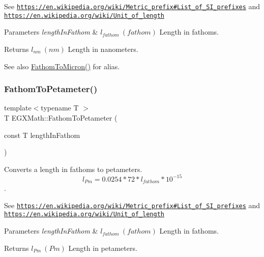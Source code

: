 See \href{https://en.wikipedia.org/wiki/Metric_prefix#List_of_SI_prefixes}{\tt https\+://en.\+wikipedia.\+org/wiki/\+Metric\+\_\+prefix\#\+List\+\_\+of\+\_\+\+S\+I\+\_\+prefixes} and \href{https://en.wikipedia.org/wiki/Unit_of_length}{\tt https\+://en.\+wikipedia.\+org/wiki/\+Unit\+\_\+of\+\_\+length} 
\begin{DoxyParams}{Parameters}
{\em length\+In\+Fathom} & $ l_{fathom}\ (fathom)$ Length in fathoms. \\
\hline
\end{DoxyParams}
\begin{DoxyReturn}{Returns}
$ l_{nm}\ (nm)$ Length in nanometers. 
\end{DoxyReturn}
\begin{DoxySeeAlso}{See also}
\mbox{\hyperlink{group___e_g_x_math-_conversions-_length_conversions-_nautical-_fathom-_non-_s_i_ga491b6bb1b4db49ba22471e9ca9855198}{Fathom\+To\+Micron()}} for alias. 
\end{DoxySeeAlso}
\mbox{\label{group___e_g_x_math-_conversions-_length_conversions-_nautical-_fathom-_s_i_ga1b39213b85524f677fed7b3d5a7052ce}} 
\subsubsection{\texorpdfstring{Fathom\+To\+Petameter()}{FathomToPetameter()}}
{\footnotesize\ttfamily template$<$typename T $>$ \\
T E\+G\+X\+Math\+::\+Fathom\+To\+Petameter (\begin{DoxyParamCaption}\item[{const T}]{length\+In\+Fathom }\end{DoxyParamCaption})}



Converts a length in fathoms to petameters. \[ l_{Pm}=0.0254 * 72 * l_{fathom} * 10^{-15} \]. 

See \href{https://en.wikipedia.org/wiki/Metric_prefix#List_of_SI_prefixes}{\tt https\+://en.\+wikipedia.\+org/wiki/\+Metric\+\_\+prefix\#\+List\+\_\+of\+\_\+\+S\+I\+\_\+prefixes} and \href{https://en.wikipedia.org/wiki/Unit_of_length}{\tt https\+://en.\+wikipedia.\+org/wiki/\+Unit\+\_\+of\+\_\+length} 
\begin{DoxyParams}{Parameters}
{\em length\+In\+Fathom} & $ l_{fathom}\ (fathom)$ Length in fathoms. \\
\hline
\end{DoxyParams}
\begin{DoxyReturn}{Returns}
$ l_{Pm}\ (Pm)$ Length in petameters. 
\end{DoxyReturn}
\mbox{\label{group___e_g_x_math-_conversions-_length_conversions-_nautical-_fathom-_s_i_gad5fe5d3a1a48420dc43cd2826a9b6f71}} 
